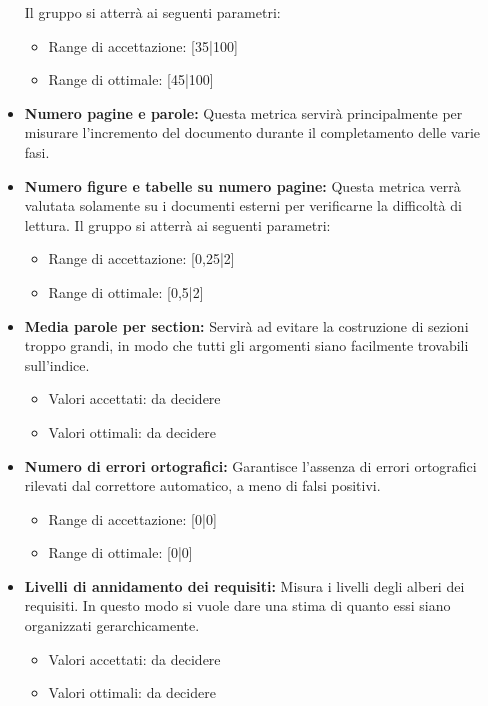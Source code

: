 \documentclass[a4paper]{article}
\begin{document}
\begin{itemize}
				Il gruppo si atterrà ai seguenti parametri:
				\begin{itemize}
					\item Range di accettazione: [35|100]
					\item Range di ottimale: [45|100]
				\end{itemize}
				\item \textbf{Numero pagine e parole:} Questa metrica servirà principalmente per misurare l'incremento del documento durante il completamento delle varie fasi.
				\item \textbf{Numero figure e tabelle su numero pagine:} Questa metrica verrà valutata solamente su i documenti esterni per verificarne la difficoltà di lettura.
				Il gruppo si atterrà ai seguenti parametri:
				\begin{itemize}
					\item Range di accettazione: [0,25|2]
					\item Range di ottimale: [0,5|2]
				\end{itemize}
				\item \textbf{Media parole per section:} Servirà ad evitare la costruzione di sezioni troppo grandi, in modo che tutti
				gli argomenti siano facilmente trovabili sull'indice.
				\begin{itemize}
					\item Valori accettati: da decidere
					\item Valori ottimali: da decidere
				\end{itemize}
				\item \textbf{Numero di errori ortografici:} 
				Garantisce l'assenza di errori ortografici rilevati dal correttore automatico, a meno di falsi positivi.
				\begin{itemize}
					\item Range di accettazione: [0|0]
					\item Range di ottimale: [0|0]
				\end{itemize}
				
				\item \textbf{Livelli di annidamento dei requisiti:}
				Misura i livelli degli alberi dei requisiti. In questo modo si vuole dare una stima di quanto essi
				siano organizzati gerarchicamente.
				\begin{itemize}
					\item Valori accettati: da decidere
							\item Valori ottimali: da decidere
				\end{itemize}
				
			\end{itemize}
				
\end{document}
